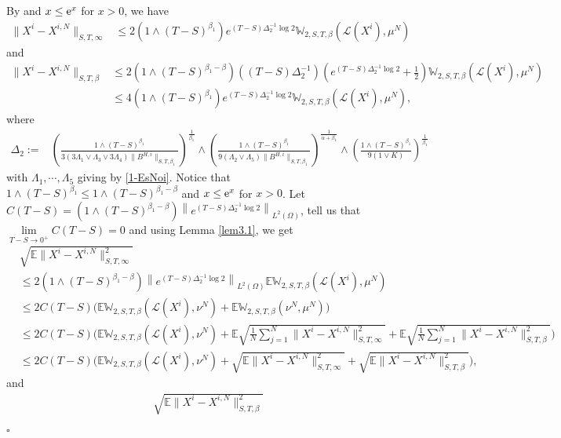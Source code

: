 \documentclass[12pt]{article}
\def\L{\mathscr{L}}
\def\E{\mathbb E}
\def\e{\text{\rm{e}}}
\def\W{\mathbb{W}}
\newenvironment{proof}{{\noindent\it Proof.}\ }{\hfill $\square$\par}
\numberwithin{equation}{section}
\begin{document}
\begin{proof}
\begin{align*}
		\end{align*}
By   \cite[Proposition 3.8]{fan} and $x\leq \e^x$ for $x>0$, we have
\begin{align}\label{2PfLeContr}
	\|X^i-X^{i,N}\|_{S,T,\infty}
	& \leq 2 (1\wedge (T-S)^{\beta_1})e^{(T-S)\Delta_2^{-1}\log 2}\W_{2,S,T,\beta}(\L(X^i),\mu^N)
\end{align}
and
\begin{align*}
\|X^i-X^{i,N}\|_{S,T,\beta}&\leq  2(1\wedge (T-S)^{\beta_1-\beta}) \left((T-S)\Delta_2^{-1}\right)\left(  e^{(T-S)\Delta_2^{-1}\log 2}+\frac { 1} {2}\right)\W_{2,S,T,\beta}(\L(X^i),\mu^N)\\
&\leq 4 (1\wedge (T-S)^{\beta_1})e^{(T-S)\Delta_2^{-1}\log 2}\W_{2,S,T,\beta}(\L(X^i),\mu^N),
\end{align*}
where
\begin{align}\label{1LeContr}
\Delta_2:=&\left(\frac { 1  \wedge (T-S)^{\beta_1}} {3(3\Lambda_1\vee \Lambda_3\vee3\Lambda_4 )\|B^{H,i}\|_{S,T,\beta_1}}\right)^{\frac 1 {\beta_1}}\wedge\left(\frac {1\wedge (T-S)^{\beta_1}} {9 (\Lambda_2\vee \Lambda_5)\|B^{H,i}\|_{S,T,\beta_1}}\right)^{\frac 1 {\alpha+\beta_1}}\wedge\left(\frac {1\wedge (T-S)^{\beta_1}} {9 (1\vee K)}\right)^{\frac 1 {\beta_1}}
\end{align}
with $\Lambda_1,\cdots,\Lambda_5$ giving by \eqref{1-EsNoi}.
	Notice that $1\wedge (T-S)^{\beta_1}\leq 1\wedge (T-S)^{\beta_1-\beta}$ and $x\leq \e^x$ for $x>0$. Let $C(T-S)=(1\wedge (T-S)^{\beta_1-\beta})\left\|e^{(T-S)\Delta_2^{-1}\log 2}\right\|_{L^2(\Omega)}$, \cite{fan} tell us that $\lim\limits_{T-S \to 0^+}C(T-S)=0$ and using Lemma \ref{lem3.1}, we get
	\begin{align*}
		&\sqrt{\E\|X^i-X^{i,N}\|^2_{S,T,\infty}}\\
		&\leq 2(1\wedge (T-S)^{\beta_1-\beta})  \left\|e^{(T-S)\Delta_2^{-1}\log 2}\right\|_{L^2(\Omega)}\E\W_{2,S,T,\beta}(\L(X^i),\mu^N)\\
		&\leq 2C(T-S)  \Big(\E\W_{2,S,T,\beta}(\L(X^i),\nu^N)+\E\W_{2,S,T,\beta}(\nu^N,\mu^N)\Big)\\
		&\leq 2C(T-S)  \Big(\E\W_{2,S,T,\beta}(\L(X^i),\nu^N)+\E\sqrt{\frac{1}{N}\sum_{j=1}^N\|X^i-X^{i,N}\|^2_{S,T,\infty}}+\E\sqrt{\frac{1}{N}\sum_{j=1}^N\|X^i-X^{i,N}\|^2_{S,T,\beta}}\Big)\\
		&\leq 2C(T-S)\Big(\E\W_{2,S,T,\beta}(\L(X^i),\nu^N)+\sqrt{\E\|X^i-X^{i,N}\|^2_{S,T,\infty}}+\sqrt{\E\|X^i-X^{i,N}\|^2_{S,T,\beta}}\Big),
	\end{align*}
	and
	\begin{align*}
		&\sqrt{\E\|X^i-X^{i,N}\|^2_{S,T,\beta}}\\

\end{align*}
\end{proof}
\end{document}
